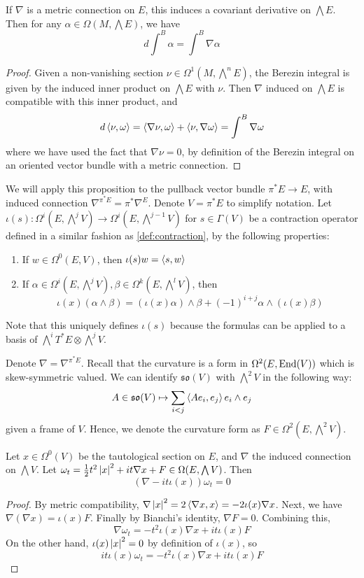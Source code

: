 \begin{prop} \label{prop:derivative_berezin} %
	If $\nabla$ is a metric connection on  $E$, this induces a covariant
	derivative on $\bigwedge E$. Then for any
	$\alpha\in\Omega(M,\bigwedge E)$, we have 
	\[
	d\int^B \alpha = \int^B \nabla\alpha
	\] 
\end{prop}
\begin{proof} 
	Given a non-vanishing section $\nu\in \Omega^1(M,\bigwedge^nE)$,
	the Berezin integral is given by the induced inner product on $\bigwedge E$
	with  $\nu$. Then  $\nabla$ induced on  $\bigwedge E$ is compatible with
	this inner product, and 
	\[
	d\gen{\nu,\omega} = \gen{\nabla \nu, \omega} + \gen{\nu, \nabla \omega}
	=\int^B \nabla\omega
	\] 
	where we have used the fact that $\nabla \nu = 0$, by definition of the
	Berezin integral on an oriented vector bundle with a metric connection.
\end{proof}

We will apply this proposition to the pullback vector bundle $\pi^*E \to E$, 
with induced connection $\nabla^{\pi^*E}=\pi^*\nabla^E$. Denote $V=\pi^*E$ to
simplify notation.
Let $\iota(s):\Omega^i(E,\bigwedge^j V) \to
\Omega^i(E,\bigwedge^{j-1} V)$ for $s\in\Gamma(V)$ be a contraction operator
defined in a similar fashion as \ref{def:contraction}, by the following
properties:
\begin{enumerate}[(1)]
    \item If $w\in \Omega^0(E,V)$, then  $\iota(s)w = \gen{s,w}$
	\item If $\alpha\in\Omega^i(E,\bigwedge^jV),
		\beta\in\Omega^k(E,\bigwedge^lV)$, then 
	 \[
	\iota(x)(\alpha\wedge \beta) 
	= (\iota(x)\alpha)\wedge\beta + (-1)^{i+j}\alpha\wedge(\iota(x)\beta)
	\] 
\end{enumerate}
Note that this uniquely defines $\iota(s)$ because the formulas can be applied
to a basis of $\bigwedge^iT^*E\otimes \bigwedge^jV$.

Denote $\nabla = \nabla^{\pi^*E}$. 
Recall that the curvature is a form in $\Omega^2(E,\operatorname{End}(V))$ 
which is skew-symmetric valued. We can identify $\mathfrak{so}(V)$ with 
$\bigwedge^2 V$ in the following way:
\[
	A\in \mathfrak{so}(V) \mapsto \sum_{i<j} \gen{Ae_i,e_j} e_i\wedge e_j
\] 
given a frame of $V$. Hence, we denote the curvature form as $F \in
\Omega^2(E,\bigwedge^2V)$.

\begin{prop} \label{prop:closed_prop} %
	Let $x \in \Omega^0(V)$ be the tautological section on $E$, and $\nabla$ the
	induced connection on $\bigwedge V$.
	Let $\omega_t = \frac{1}{2}t^2\abs{x}^2 + it\nabla x + F 
	\in \Omega(E,\bigwedge V)$. Then 
	\[
		(\nabla - it\iota(x))\omega_t = 0
	\] 
\end{prop}
\begin{proof}
	 By metric compatibility,
	$\nabla \abs{x}^2 = 2\gen{\nabla x, x} = -2\iota(x)\nabla x$.
	Next, we have $\nabla(\nabla x) = \iota(x) F$.
	Finally by Bianchi's identity, $\nabla F = 0$. Combining this,
	\[
	\nabla \omega_t = -t^2\iota(x) \nabla x + it\iota(x)F 
	\] 
	On the other hand, $\iota(x)\abs{x}^2 = 0$ by definition of $\iota(x)$, so
	\[
	it\iota(x)\omega_t = -t^2\iota(x) \nabla x + it\iota(x)F
	\] 
\end{proof}

